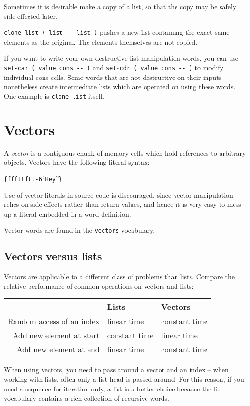 \documentclass[english]{article}
\providecommand{\tabularnewline}{\\}
\begin{document}
Sometimes it is desirable make a copy of a list, so that the copy
may be safely side-effected later.

\texttt{clone-list ( list -{}- list )} pushes a new list containing
the exact same elements as the original. The elements themselves are
not copied.

If you want to write your own destructive list manipulation words,
you can use \texttt{set-car ( value cons -{}- )} and \texttt{set-cdr
( value cons -{}- )} to modify individual cons cells. Some words that
are not destructive on their inputs nonetheless create intermediate
lists which are operated on using these words. One example is \texttt{clone-list}
itself.


\section{\label{sub:Vectors}Vectors}

A \emph{vector} is a contiguous chunk of memory cells which hold references to arbitrary
objects. Vectors have the following literal syntax:

\begin{alltt}
\{ f f f t t f t t -6 {}``Hey'' \}
\end{alltt}
Use of vector literals in source code is discouraged, since vector
manipulation relies on side effects rather than return values, and
hence it is very easy to mess up a literal embedded in a word definition.

Vector words are found in the \texttt{vectors} vocabulary.

\subsection{Vectors versus lists}

Vectors are applicable to a different class of problems than lists.
Compare the relative performance of common operations on vectors and
lists:

\begin{tabular}{|r|l|l|}
\hline 
&
Lists&
Vectors\tabularnewline
\hline
\hline 
Random access of an index&
linear time&
constant time\tabularnewline
\hline 
Add new element at start&
constant time&
linear time\tabularnewline
\hline 
Add new element at end&
linear time&
constant time\tabularnewline
\hline
\end{tabular}

When using vectors, you need to pass around a vector and an index
-- when working with lists, often only a list head is passed around.
For this reason, if you need a sequence for iteration only, a list
is a better choice because the list vocabulary contains a rich collection
of recursive words.
\end{document}
